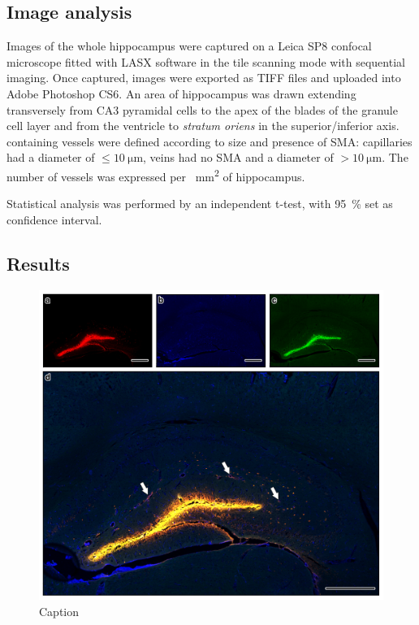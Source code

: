 \documentclass[a4paper,titlepage]{scrartcl}
\begin{document}
\subsection{Image analysis}

Images of the whole hippocampus were captured on a Leica SP8 confocal microscope fitted with LASX software in the tile scanning mode with sequential imaging. Once captured, images were exported as TIFF files and uploaded into Adobe Photoshop CS6. An area of hippocampus was drawn extending transversely from CA3 pyramidal cells to the apex of the blades of the granule cell layer and from the ventricle to \textit{stratum oriens} in the superior/inferior axis. \Ab containing vessels were defined according to size and presence of SMA: capillaries had a diameter of $\leq \SI{10}{\micro\metre}$, veins had no SMA and a diameter of $> \SI{10}{\micro\metre}$. The number of vessels was expressed per \SI{}{\square\milli\metre} of hippocampus.

Statistical analysis was performed by an independent t-test, with \SI{95}{\percent} set as confidence interval.


\subsection{Results}

\begin{figure}
  \centerline{\includegraphics{figures/confocal.jpg}}
  \caption{Caption\label{fig:confocal}}
\end{figure}
\end{document}
